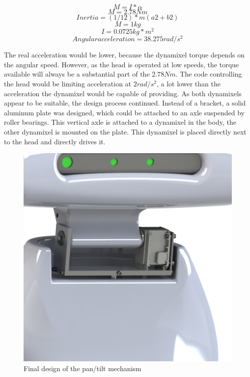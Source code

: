 \documentclass[technical_document.tex]{subfiles}
\begin{document}
\begin{equation*}
M = I * \alpha
\end{equation*}
\begin{equation*}
M = 2.78Nm
\end{equation*}
\begin{equation*}
Inertia = (1/12) * m (a2 + b2)
\end{equation*}
\begin{equation*}
M = 1kg
\end{equation*}
\begin{equation*}
I = 0.0725 kg*m^2
\end{equation*}
\begin{equation*}
Angular acceleration = 38.275 rad/s^2
\end{equation*}


The real acceleration would be lower, because the dynamixel torque depends on the angular speed. However, as the head is operated at low speeds, the torque available will always be a substantial part of the $2.78Nm$. The code controlling the head would be limiting acceleration at $2 rad/s^2$, a lot lower than the acceleration the dynamixel would be capable of providing.
As both dynamixels appear to be suitable, the design process continued. Instead of a bracket, a solid aluminum plate was designed, which could be attached to an axle suspended by roller bearings. This vertical axle is attached to a dynamixel in the body, the other dynamixel is mounted on the plate. This dynamixel is placed directly next to the head and directly drives it.

\begin{figure}[ht!]
	\centering
	\mbox{\includegraphics[scale=0.8]{Images/neck.png}}
	\caption{Final design of the pan/tilt mechanism}
	\label{fig:neck_final}
\end{figure}
\end{document}

